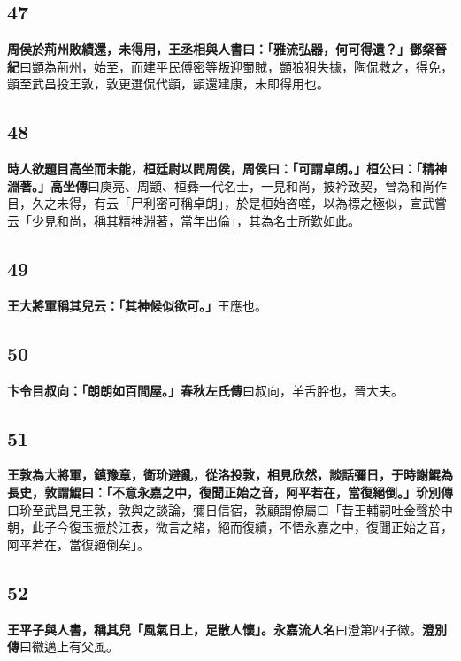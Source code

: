 \subsection*{47}

\textbf{周侯於荊州敗績還，未得用，王丞相與人書曰：「雅流弘器，何可得遺？」}{\footnotesize \textbf{鄧粲晉紀}曰顗為荊州，始至，而建平民傅密等叛迎蜀賊，顗狼狽失據，陶侃救之，得免，顗至武昌投王敦，敦更選侃代顗，顗還建康，未即得用也。}

\subsection*{48}

\textbf{時人欲題目高坐而未能，桓廷尉以問周侯，周侯曰：「可謂卓朗。」桓公曰：「精神淵著。」}{\footnotesize \textbf{高坐傳}曰庾亮、周顗、桓彝一代名士，一見和尚，披衿致契，曾為和尚作目，久之未得，有云「尸利密可稱卓朗」，於是桓始咨嗟，以為標之極似，宣武嘗云「少見和尚，稱其精神淵著，當年出倫」，其為名士所歎如此。}

\subsection*{49}

\textbf{王大將軍稱其兒云：「其神候似欲可。」}{\footnotesize 王應也。}

\subsection*{50}

\textbf{卞令目叔向：「朗朗如百間屋。」}{\footnotesize \textbf{春秋左氏傳}曰叔向，羊舌肸也，晉大夫。}

\subsection*{51}

\textbf{王敦為大將軍，鎮豫章，衛玠避亂，從洛投敦，相見欣然，談話彌日，于時謝鯤為長史，敦謂鯤曰：「不意永嘉之中，復聞正始之音，阿平若在，當復絕倒。」}{\footnotesize \textbf{玠別傳}曰玠至武昌見王敦，敦與之談論，彌日信宿，敦顧謂僚屬曰「昔王輔嗣吐金聲於中朝，此子今復玉振於江表，微言之緒，絕而復續，不悟永嘉之中，復聞正始之音，阿平若在，當復絕倒矣」。}

\subsection*{52}

\textbf{王平子與人書，稱其兒「風氣日上，足散人懷」。}{\footnotesize \textbf{永嘉流人名}曰澄第四子徽。\textbf{澄別傳}曰徽邁上有父風。}

